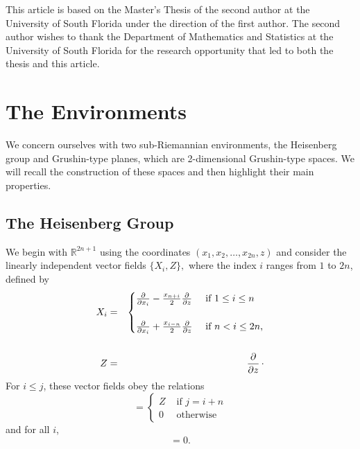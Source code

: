 \documentclass[12pt]{amsart}
\theoremstyle{plain}
\theoremstyle{definition}
\numberwithin{equation}{section}
\begin{document}
This article is based on the Master's Thesis of the second author at the University of South Florida under the direction of the first author. The second author wishes to thank the Department of Mathematics and Statistics at the University of South Florida for the research opportunity that led to both the thesis and this article. 
\section{The Environments}
We concern ourselves with two sub-Riemannian environments, the Heisenberg group and Grushin-type planes, which are 2-dimensional Grushin-type spaces. We will recall the construction of these spaces and then highlight their main properties.
\subsection{The Heisenberg Group}
We begin with $\mathbb{R}^{2n+1}$ using the coordinates $(x_1,x_2,\ldots, x_{2n},z)$ and consider the linearly
independent vector fields $ \{X_i,Z\}, $ where the index $i$ ranges from $1$ to $2n$, defined by  
\begin{eqnarray*}
 	X_i & = & \begin{cases} 
  			\frac{ {\displaystyle} \partial }{{\displaystyle} \partial x_i} - 
			\frac{ {\displaystyle} x_{n+i}} { {\displaystyle} 2}
			 \frac{ {\displaystyle} \partial }{{\displaystyle} \partial z}& 
			            \text{ if  $1 \leq i\leq n$} \\ \\
			\frac{ {\displaystyle} \partial }{ {\displaystyle} \partial x_{i}} + 
			\frac{{\displaystyle} x_{i-n}} { {\displaystyle} 2}
			 \frac{ {\displaystyle} \partial }{{\displaystyle} \partial z} 
			         & \text{ if  $n < i \leq 2n$,}
			\end{cases}\\
 &   &  \\
Z & = & \frac{ {\displaystyle} \partial }{ {\displaystyle} \partial z}  \, \cdot
\end{eqnarray*} 
For $i \leq j$, these vector fields obey the relations 
\begin{equation*}
 	[X_i,X_j] =  \begin{cases} 
  			Z & \text{ if  $j=i+n$} \\ 
			0 & \text{ otherwise}
			\end{cases}
\end{equation*}
and for all $i$, 
\begin{equation*}
[X_i,Z] = 0.
\end{equation*}
\end{document}
